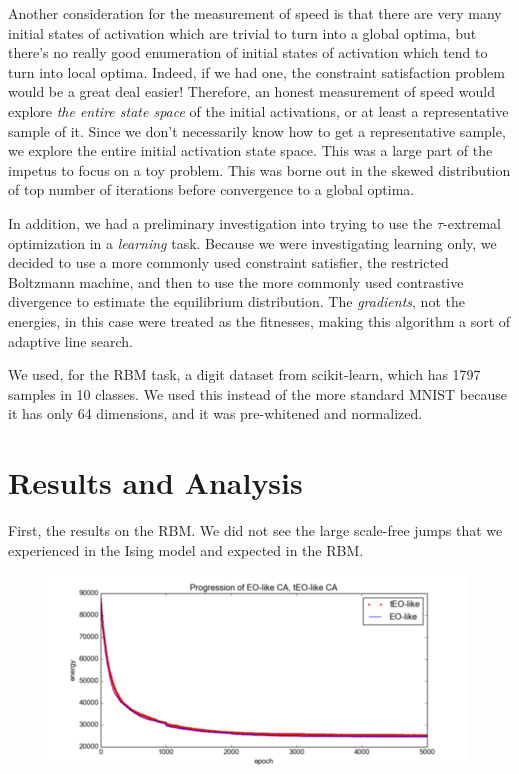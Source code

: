 \documentclass[12pt]{article}
\begin{document}
Another consideration for the measurement of speed is that there are very many initial states of activation which are trivial to turn into a global optima, but there's no really good enumeration of initial states of activation which tend to turn into local optima. Indeed, if we had one, the constraint satisfaction problem would be a great deal easier! Therefore, an honest measurement of speed would explore \emph{the entire state space} of the initial activations, or at least a representative sample of it. Since we don't necessarily know how to get a representative sample, we explore the entire initial activation state space. This was a large part of the impetus to focus on a toy problem. This was borne out in the skewed distribution of top number of iterations before convergence to a global optima.

In addition, we had a preliminary investigation into trying to use the $\tau$-extremal optimization in a \emph{learning} task. Because we were investigating learning only, we decided to use a more commonly used constraint satisfier, the restricted Boltzmann machine, and then to use the more commonly used contrastive divergence to estimate the equilibrium distribution. The \emph{gradients}, not the energies, in this case were treated as the fitnesses, making this algorithm a sort of adaptive line search.

We used, for the RBM task, a digit dataset from scikit-learn, which has 1797 samples in 10 classes. We used this instead of the more standard MNIST because it has only 64 dimensions, and it was pre-whitened and normalized. %

\section{Results and Analysis}
First, the results on the RBM. We did not see the large scale-free jumps that we experienced in the Ising model and expected in the RBM.

  
\begin{figure}
  \includegraphics{eo_rbm_unzoomed}
\end{figure}
\end{document}
